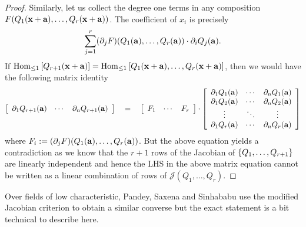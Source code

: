 \begin{proof}
Similarly, let us collect the degree one terms in any composition $F(Q_1(\mathbf{x} + \mathbf{a}),\ldots, Q_r(\mathbf{x} + \mathbf{a}))$. The coefficient of $x_i$ is precisely
\[
\sum_{j=1}^r (\partial_jF)(Q_1(\mathbf{a}),\ldots,Q_r(\mathbf{a})) \cdot  \partial_i Q_j(\mathbf{a}). 
\]
If $\operatorname{Hom}_{\leq 1}\left[Q_{r+1}(\mathbf{x} + \mathbf{a})\right] = \operatorname{Hom}_{\leq 1}\left[Q_1(\mathbf{x} + \mathbf{a}), \ldots, Q_r(\mathbf{x} + \mathbf{a})\right]$, then we would have the following matrix identity
\[
\left[\begin{array}{ccc}
\partial_1 Q_{r+1}(\mathbf{a}) & \cdots & \partial_n Q_{r+1}(\mathbf{a})
          \end{array}\right] \quad = \quad \left[\begin{array}{ccc}F_1 & \cdots & F_r\end{array}\right] \cdot 
\left[\begin{array}{ccc}
\partial_1Q_1(\mathbf{a}) & \cdots & \partial_nQ_1(\mathbf{a})\\
\partial_1Q_2(\mathbf{a}) & \cdots & \partial_nQ_2(\mathbf{a})\\
\vdots &  \ddots & \vdots\\
\partial_1Q_{r}(\mathbf{a}) &  \cdots & \partial_nQ_{r}(\mathbf{a})
                                          \end{array}\right]                                          
                                          \]
where $F_i := (\partial_jF)(Q_1(\mathbf{a}),\ldots,Q_r(\mathbf{a}))$. But the above equation yields a contradiction as we know that the $r+1$ rows of the Jacobian of $\left\{Q_1,\ldots, Q_{r+1}\right\}$ are linearly independent and hence the LHS in the above matrix equation cannot be written as a linear combination of rows of $\mathcal{J}(Q_1,\ldots, Q_r)$.
\end{proof}

Over fields of low characteristic, Pandey, Saxena and Sinhababu \cite{PSS16} use the modified Jacobian criterion to obtain a similar converse but the exact statement is a bit technical to describe here.


